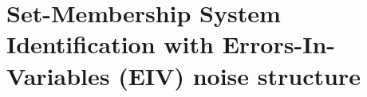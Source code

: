 \chapter[SM SysId with EIV noise structure]{Set-Membership System Identification with Errors-In-Variables (EIV) noise structure}